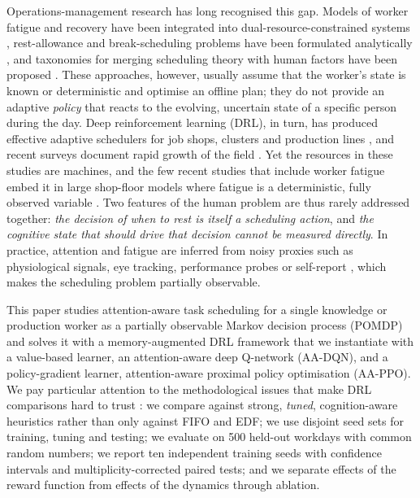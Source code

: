 Operations-management research has long recognised this gap. Models of worker fatigue and recovery have been integrated into dual-resource-constrained systems \cite{jaber2010,jaber2013,givi2015}, rest-allowance and break-scheduling problems have been formulated analytically \cite{bechtold1984,konz1998,calzavara2019}, and taxonomies for merging scheduling theory with human factors have been proposed \cite{lodree2009,neumann2010,boudreau2003,katiraee2021}. These approaches, however, usually assume that the worker's state is known or deterministic and optimise an offline plan; they do not provide an adaptive \emph{policy} that reacts to the evolving, uncertain state of a specific person during the day. Deep reinforcement learning (DRL), in turn, has produced effective adaptive schedulers for job shops, clusters and production lines \cite{mao2016,mao2019,waschneck2018,luo2020,zhang2020l2d,park2021,song2023}, and recent surveys document rapid growth of the field \cite{kayhan2023,panzer2022,khadivi2025}. Yet the resources in these studies are machines, and the few recent studies that include worker fatigue embed it in large shop-floor models where fatigue is a deterministic, fully observed variable \cite{tan2021,hu2025}. Two features of the human problem are thus rarely addressed together: \emph{the decision of when to rest is itself a scheduling action}, and \emph{the cognitive state that should drive that decision cannot be measured directly}. In practice, attention and fatigue are inferred from noisy proxies such as physiological signals, eye tracking, performance probes or self-report \cite{charles2019,borghini2014,hogervorst2014,basner2011,hart1988}, which makes the scheduling problem partially observable.

This paper studies attention-aware task scheduling for a single knowledge or production worker as a partially observable Markov decision process (POMDP) \cite{astrom1965,smallwood1973,kaelbling1998} and solves it with a memory-augmented DRL framework that we instantiate with a value-based learner, an attention-aware deep Q-network (AA-DQN), and a policy-gradient learner, attention-aware proximal policy optimisation (AA-PPO). We pay particular attention to the methodological issues that make DRL comparisons hard to trust \cite{henderson2018,agarwal2021}: we compare against strong, \emph{tuned}, cognition-aware heuristics rather than only against FIFO and EDF; we use disjoint seed sets for training, tuning and testing; we evaluate on 500 held-out workdays with common random numbers; we report ten independent training seeds with confidence intervals and multiplicity-corrected paired tests; and we separate effects of the reward function from effects of the dynamics through ablation.

